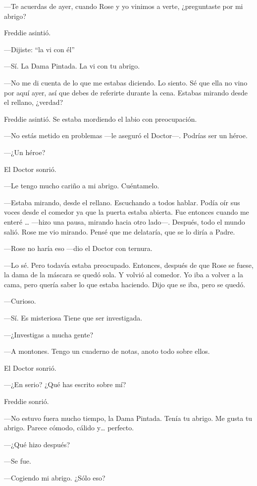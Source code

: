{---Te acuerdas de ayer, cuando Rose y yo vinimos a verte, ¿preguntaste
por mi abrigo?}

{Freddie asintió.}

{---Dijiste: ``la vi con él''}

{---Sí. La Dama Pintada. La vi con tu abrigo.}

{---No me di cuenta de lo que me estabas diciendo. Lo siento. Sé que
	ella no vino por aquí ayer, así que debes de referirte durante la cena.
Estabas mirando desde el rellano, ¿verdad?}

{Freddie asintió. Se estaba mordiendo el labio con preocupación.}

{---No estás metido en problemas ---le aseguró el Doctor---. Podrías ser
un héroe.}

{---¿Un héroe?}

{El Doctor sonrió.}

{---Le tengo mucho cariño a mi abrigo. Cuéntamelo.}

{---Estaba mirando, desde el rellano. Escuchando a todos hablar. Podía
	oír sus voces desde el comedor ya que la puerta estaba abierta. Fue
	entonces cuando me enteré \ldots{} ---hizo una pausa, mirando hacia otro
	lado---. Después, todo el mundo salió. Rose me vio mirando. Pensé que me
delataría, que se lo diría a Padre.}

{---Rose no haría eso ---dio el Doctor con ternura.}

{---Lo sé. Pero todavía estaba preocupado. Entonces, después de que Rose
	se fuese, la dama de la máscara se quedó sola. Y volvió al comedor. Yo
	iba a volver a la cama, pero quería saber lo que estaba haciendo. Dijo
que se iba, pero se quedó.}

{---Curioso.}

{---Sí. Es misteriosa Tiene que ser investigada.}

{---¿Investigas a mucha gente?}

{---A montones. Tengo un cuaderno de notas, anoto todo sobre ellos.}

{El Doctor sonrió.}

{---¿En serio? ¿Qué has escrito sobre mí?}

{Freddie sonrió.}

{---No estuvo fuera mucho tiempo, la Dama Pintada. Tenía tu abrigo. Me
	gusta tu abrigo. Parece cómodo, cálido y\ldots{} perfecto.}

{---¿Qué hizo después?}

{---Se fue.}

{---Cogiendo mi abrigo. ¿Sólo eso?}

